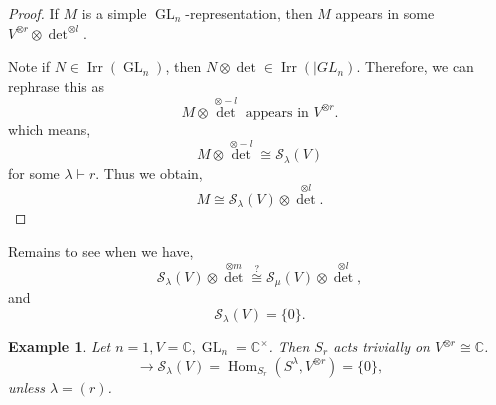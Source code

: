 \documentclass[10pt]{article}
\newtheorem{example}{Example}[section]
\numberwithin{equation}{theorem}
\DeclareMathOperator{\Irr}{Irr}
\DeclareMathOperator{\GL}{GL}
\DeclareMathOperator{\Hom}{Hom}
\newcommand{\C}[0]{\mathbb{C}}
\begin{document}
\begin{proof}
  If $M$ is a simple $\GL_n$-representation, then $M$ appears in some $V^{\otimes r}\otimes \det^{\otimes l}$.\\
  \par Note if $N\in\Irr(\GL_n)$, then $N\otimes \det\in\Irr(|GL_n)$. Therefore, we can rephrase this as 
  \begin{equation*}
    M\otimes {\det}^{\otimes -l}\text{ appears in }V^{\otimes r}.
  \end{equation*}
  which means,
  \begin{equation*}
    M\otimes {\det}^{\otimes-l} \cong \mathcal{S}_\lambda(V)
  \end{equation*}
  for some $\lambda\vdash r$. Thus we obtain,
  \begin{equation*}
    M \cong \mathcal{S}_\lambda(V)\otimes{\det}^{\otimes l}.
  \end{equation*}
\end{proof}
Remains to see when we have,
  \begin{equation*}
    \mathcal{S}_\lambda(V)\otimes {\det}^{\otimes m}\stackrel{?}{\cong}\mathcal{S}_\mu(V)\otimes {\det}^{\otimes l},
  \end{equation*}
and  
\begin{equation*}
\mathcal{S}_\lambda(V)=\{0\}.
\end{equation*}
  \begin{example}
    \label{example_42}
    Let $n=1,V=\C,\GL_n=\C^\times$. Then $S_r$ acts trivially on $V^{\otimes r} \cong \C$. 
    \begin{equation*}
      \rightarrow \mathcal{S}_\lambda(V)  = \Hom_{S_r}(S^\lambda,V^{\otimes r}) = \{0\},
    \end{equation*}
    unless $\lambda = (r)$.
  \end{example}
\end{document}
